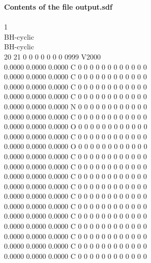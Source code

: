 \documentclass[11pt,titlepage,dvipdfmx,twoside]{book}
\begin{document}
{\begin{oframed}
{\bf Contents of the file output.sdf}\\\\
{1 \\
BH-cyclic \\
BH-cyclic \\
 20 21  0  0  0  0  0  0  0  0999 V2000 \\
    0.0000    0.0000    0.0000  C  0  0  0  0  0  0  0  0  0  0  0  0 \\
    0.0000    0.0000    0.0000  C  0  0  0  0  0  0  0  0  0  0  0  0 \\
    0.0000    0.0000    0.0000  C  0  0  0  0  0  0  0  0  0  0  0  0 \\
    0.0000    0.0000    0.0000  C  0  0  0  0  0  0  0  0  0  0  0  0 \\
    0.0000    0.0000    0.0000  N  0  0  0  0  0  0  0  0  0  0  0  0 \\
    0.0000    0.0000    0.0000  C  0  0  0  0  0  0  0  0  0  0  0  0 \\
    0.0000    0.0000    0.0000  O  0  0  0  0  0  0  0  0  0  0  0  0 \\
    0.0000    0.0000    0.0000  C  0  0  0  0  0  0  0  0  0  0  0  0 \\
    0.0000    0.0000    0.0000  O  0  0  0  0  0  0  0  0  0  0  0  0 \\
    0.0000    0.0000    0.0000  C  0  0  0  0  0  0  0  0  0  0  0  0 \\
    0.0000    0.0000    0.0000  C  0  0  0  0  0  0  0  0  0  0  0  0 \\
    0.0000    0.0000    0.0000  C  0  0  0  0  0  0  0  0  0  0  0  0 \\
    0.0000    0.0000    0.0000  C  0  0  0  0  0  0  0  0  0  0  0  0 \\
    0.0000    0.0000    0.0000  C  0  0  0  0  0  0  0  0  0  0  0  0 \\
    0.0000    0.0000    0.0000  C  0  0  0  0  0  0  0  0  0  0  0  0 \\
    0.0000    0.0000    0.0000  C  0  0  0  0  0  0  0  0  0  0  0  0 \\
    0.0000    0.0000    0.0000  C  0  0  0  0  0  0  0  0  0  0  0  0 \\
    0.0000    0.0000    0.0000  C  0  0  0  0  0  0  0  0  0  0  0  0 \\
    0.0000    0.0000    0.0000  C  0  0  0  0  0  0  0  0  0  0  0  0 \\
    0.0000    0.0000    0.0000  C  0  0  0  0  0  0  0  0  0  0  0  0 \\
}
\end{oframed}}
\end{document}
